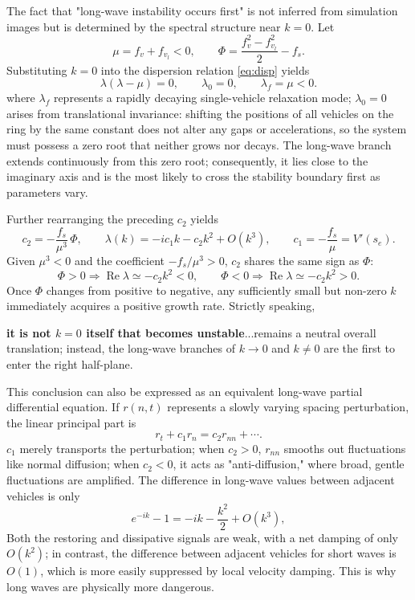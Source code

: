 \documentclass[11pt,a4paper,openany]{book}
\numberwithin{equation}{chapter}
\numberwithin{figure}{chapter}
\numberwithin{table}{chapter}
\begin{document}
The fact that "long-wave instability occurs first" is not inferred from simulation images but is determined by the spectral structure near $k=0$. Let
\begin{equation}
\mu=f_v+f_{v_l}<0,
\qquad
\Phi=\frac{f_v^2-f_{v_l}^2}{2}-f_s .
\end{equation}
Substituting $k=0$ into the dispersion relation \eqref{eq:disp} yields
\begin{equation}
\lambda(\lambda-\mu)=0,
\qquad
\lambda_0=0,\qquad \lambda_f=\mu<0 .
\label{eq:k0roots}
\end{equation}
where $\lambda_f$ represents a rapidly decaying single-vehicle relaxation mode; $\lambda_0=0$ arises from translational invariance: shifting the positions of all vehicles on the ring by the same constant does not alter any gaps or accelerations, so the system must possess a zero root that neither grows nor decays. The long-wave branch extends continuously from this zero root; consequently, it lies close to the imaginary axis and is the most likely to cross the stability boundary first as parameters vary.

Further rearranging the preceding $c_2$ yields
\begin{equation}
c_2=-\frac{f_s}{\mu^3}\,\Phi,
\qquad
\lambda(k)=-ic_1k-c_2k^2+O(k^3),
\qquad
c_1=-\frac{f_s}{\mu}=V'(s_e).
\label{eq:longwave-branch}
\end{equation}
Given $\mu^3<0$ and the coefficient $-f_s/\mu^3>0$, $c_2$ shares the same sign as $\Phi$:
\begin{equation}
\Phi>0\Rightarrow\operatorname{Re}\lambda\simeq-c_2k^2<0,
\qquad
\Phi<0\Rightarrow\operatorname{Re}\lambda\simeq-c_2k^2>0.
\end{equation}
Once $\Phi$ changes from positive to negative, any sufficiently small but non-zero $k$ immediately acquires a positive growth rate. Strictly speaking,

\textbf{it is not $k=0$ itself that becomes unstable}...remains a neutral overall translation; instead, the long-wave branches of $k\to0$ and $k\ne0$ are the first to enter the right half-plane.

This conclusion can also be expressed as an equivalent long-wave partial differential equation. If $r(n,t)$ represents a slowly varying spacing perturbation, the linear principal part is
\begin{equation}
r_t+c_1r_n=c_2r_{nn}+\cdots .
\label{eq:effective-diffusion}
\end{equation}
$c_1$ merely transports the perturbation; when $c_2>0$, $r_{nn}$ smooths out fluctuations like normal diffusion; when $c_2<0$, it acts as "anti-diffusion," where broad, gentle fluctuations are amplified. The difference in long-wave values between adjacent vehicles is only
\begin{equation}
e^{-ik}-1=-ik-\frac{k^2}{2}+O(k^3),
\end{equation}
Both the restoring and dissipative signals are weak, with a net damping of only $O(k^2)$; in contrast, the difference between adjacent vehicles for short waves is $O(1)$, which is more easily suppressed by local velocity damping. This is why long waves are physically more dangerous.
\end{document}
